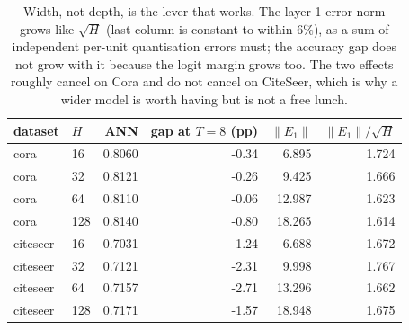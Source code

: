 \begin{table}[t]
\centering
\footnotesize
\caption{Width, not depth, is the lever that works. The layer-1 error norm grows like
$\sqrt{H}$ (last column is constant to within $6\%$), as a sum of independent per-unit
quantisation errors must; the accuracy gap does not grow with it because the logit margin grows
too. The two effects roughly cancel on Cora and do not cancel on CiteSeer, which is why a wider
model is worth having but is not a free lunch.}
\label{tab:capacity}
\begin{tabular}{llrrrr}
\toprule
dataset & $H$ & ANN & gap at $T{=}8$ (pp) & $\|E_1\|$ & $\|E_1\|/\sqrt{H}$ \\
\midrule
cora & 16 & 0.8060 & -0.34 & 6.895 & 1.724 \\
cora & 32 & 0.8121 & -0.26 & 9.425 & 1.666 \\
cora & 64 & 0.8110 & -0.06 & 12.987 & 1.623 \\
cora & 128 & 0.8140 & -0.80 & 18.265 & 1.614 \\
citeseer & 16 & 0.7031 & -1.24 & 6.688 & 1.672 \\
citeseer & 32 & 0.7121 & -2.31 & 9.998 & 1.767 \\
citeseer & 64 & 0.7157 & -2.71 & 13.296 & 1.662 \\
citeseer & 128 & 0.7171 & -1.57 & 18.948 & 1.675 \\
\bottomrule
\end{tabular}
\end{table}
